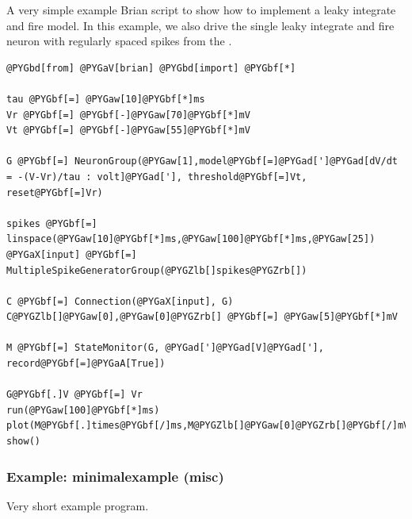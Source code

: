 \documentclass[letterpaper,10pt,english]{manual}
\begin{document}
A very simple example Brian script to show how to implement
a leaky integrate and fire model. In this example, we also
drive the single leaky integrate and fire neuron with
regularly spaced spikes from the \hyperlink{brian.SpikeGeneratorGroup}{}.

\begin{Verbatim}[commandchars=@\[\]]
@PYGbd[from] @PYGaV[brian] @PYGbd[import] @PYGbf[*]

tau @PYGbf[=] @PYGaw[10]@PYGbf[*]ms
Vr @PYGbf[=] @PYGbf[-]@PYGaw[70]@PYGbf[*]mV
Vt @PYGbf[=] @PYGbf[-]@PYGaw[55]@PYGbf[*]mV

G @PYGbf[=] NeuronGroup(@PYGaw[1],model@PYGbf[=]@PYGad[']@PYGad[dV/dt = -(V-Vr)/tau : volt]@PYGad['], threshold@PYGbf[=]Vt, reset@PYGbf[=]Vr)

spikes @PYGbf[=] linspace(@PYGaw[10]@PYGbf[*]ms,@PYGaw[100]@PYGbf[*]ms,@PYGaw[25])
@PYGaX[input] @PYGbf[=] MultipleSpikeGeneratorGroup(@PYGZlb[]spikes@PYGZrb[])

C @PYGbf[=] Connection(@PYGaX[input], G)
C@PYGZlb[]@PYGaw[0],@PYGaw[0]@PYGZrb[] @PYGbf[=] @PYGaw[5]@PYGbf[*]mV

M @PYGbf[=] StateMonitor(G, @PYGad[']@PYGad[V]@PYGad['], record@PYGbf[=]@PYGaA[True])

G@PYGbf[.]V @PYGbf[=] Vr
run(@PYGaw[100]@PYGbf[*]ms)
plot(M@PYGbf[.]times@PYGbf[/]ms,M@PYGZlb[]@PYGaw[0]@PYGZrb[]@PYGbf[/]mV)
show()
\end{Verbatim}

\resetcurrentobjects
\hypertarget{--doc-examples-misc_minimalexample}{}

\hypertarget{index-69}{}\subsubsection{Example: minimalexample (misc)}

Very short example program.
\end{document}
